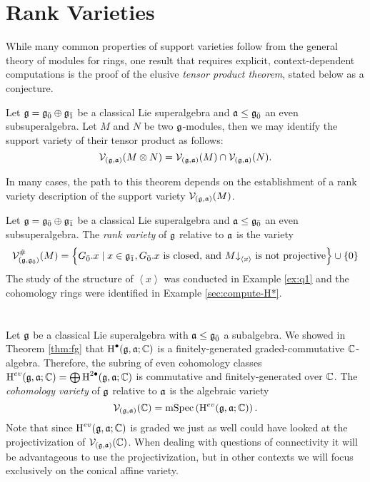 \section{Rank Varieties}
\label{sec:rank-varieties}

While many common properties of support varieties follow from the general theory of modules for rings, one result that requires explicit, context-dependent computations is the proof of the elusive \emph{tensor product theorem}, stated below as a conjecture.

\begin{conjecture}
  \label{conj:tpt}
  Let $\mathfrak{g} = {\mathfrak{g}}_{\bar{0}} \oplus {\mathfrak{g}}_{\bar{1}}$ be a classical Lie superalgebra and $\mathfrak{a} \leq {\mathfrak{g}}_{\bar{0}}$ an even subsuperalgebra. Let $M$ and $N$ be two $\mathfrak{g}$-modules, then we may identify the support variety of their tensor product as follows:
  \[
    \mathcal{V}_{(\mathfrak{g},\mathfrak{a})}(M \otimes N) = \mathcal{V}_{(\mathfrak{g},\mathfrak{a})}(M) \cap \mathcal{V}_{(\mathfrak{g},\mathfrak{a})}(N).
  \]
\end{conjecture}

In many cases, the path to this theorem depends on the establishment of a rank variety description of the support variety $\mathcal{V}_{(\mathfrak{g},\mathfrak{a})}(M)$.

\begin{definition}
  \label{def:rank-variety}
  Let $\mathfrak{g} = {\mathfrak{g}}_{\bar{0}} \oplus {\mathfrak{g}}_{\bar{1}}$ be a classical Lie superalgebra and $\mathfrak{a} \leq {\mathfrak{g}}_{\bar{0}}$ an even subsuperalgebra. The \emph{rank variety} of $\mathfrak{g}$ relative to $\mathfrak{a}$ is the variety
  \[
    \mathcal{V}_{(\mathfrak{g},{\mathfrak{g}}_{\bar{0}})}^\#(M) = \left\{ {G}_{\bar{0}}.x \mid x \in {\mathfrak{g}}_{\bar{1}}, {G}_{\bar{0}}.x \text{ is closed, and } M\mathord{\downarrow}_{\left<x\right>}\text{ is not projective}  \right\} \cup \{0\}
  \]
  The study of the structure of $\left<x\right>$ was conducted in Example \ref{ex:q1} and the cohomology rings were identified in Example \ref{sec:compute-H*}. 
\end{definition}

\section{}Let $\mathfrak{g}$ be a classical Lie superalgebra with $\mathfrak{a} \leq {\mathfrak{g}}_{\bar{0}}$ a subalgebra. We showed in Theorem \ref{thm:fg} that $\operatorname{H}^\bullet(\mathfrak{g},\mathfrak{a};\mathbb{C})$ is a finitely-generated graded-commutative $\mathbb{C}$-algebra. Therefore, the subring of even cohomology classes $\operatorname{H}^{ev}(\mathfrak{g},\mathfrak{a};\mathbb{C}) = \bigoplus \operatorname{H}^{2\bullet}(\mathfrak{g},\mathfrak{a};\mathbb{C})$ is commutative and finitely-generated over $\mathbb{C}$. The \textit{cohomology variety} of $\mathfrak{g}$ relative to $\mathfrak{a}$ is the algebraic variety
\[
  \mathcal{V}_{(\mathfrak{g},\mathfrak{a})}(\mathbb{C}) = \operatorname{mSpec}\left(\operatorname{H}^{ev}(\mathfrak{g},\mathfrak{a};\mathbb{C})\right).
\]
Note that since $\operatorname{H}^{ev}(\mathfrak{g},\mathfrak{a};\mathbb{C})$ is graded we just as well could have looked at the projectivization of $\mathcal{V}_{(\mathfrak{g},\mathfrak{a})}(\mathbb{C})$. When dealing with questions of connectivity it will be advantageous to use the projectivization, but in other contexts we will focus exclusively on the conical affine variety.

